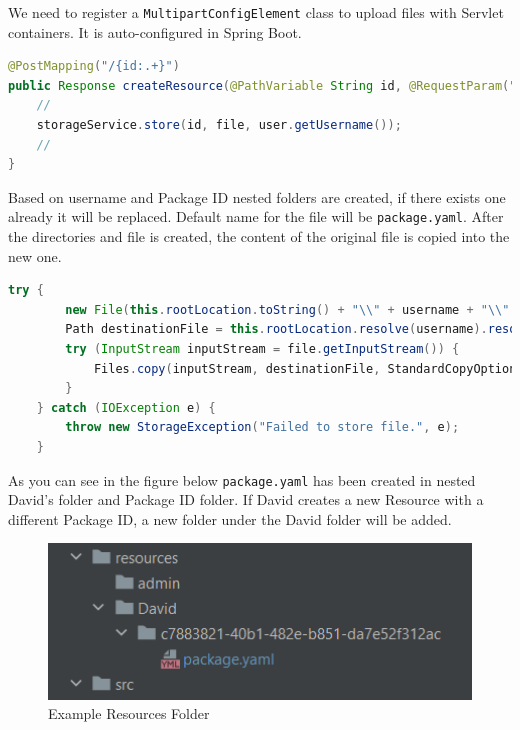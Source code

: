 We need to register a \texttt{MultipartConfigElement} class to upload files with Servlet containers. It is auto-configured in Spring Boot.

\begin{lstlisting}[language={Java}]
@PostMapping("/{id:.+}")
public Response createResource(@PathVariable String id, @RequestParam("file") MultipartFile file, @RequestParam("kind") String kind) {
    //
    storageService.store(id, file, user.getUsername());
    //
}
\end{lstlisting}

Based on username and Package ID nested folders are created, if there exists one already it will be replaced. Default name for the file will be \texttt{package.yaml}. After the directories and file is created, the content of the original file is copied into the new one.
\begin{lstlisting}[language={Java}]
    try {
        new File(this.rootLocation.toString() + "\\" + username + "\\" + id).mkdirs();
        Path destinationFile = this.rootLocation.resolve(username).resolve(id).resolve(Paths.get("package.yaml")).normalize().toAbsolutePath();
        try (InputStream inputStream = file.getInputStream()) {
            Files.copy(inputStream, destinationFile, StandardCopyOption.REPLACE_EXISTING);
        }
    } catch (IOException e) {
        throw new StorageException("Failed to store file.", e);
    }
\end{lstlisting}

As you can see in the figure below \texttt{package.yaml} has been created in nested David's folder and Package ID folder. If David creates a new Resource with a different Package ID, a new folder under the David folder will be added.
\begin{figure}[H]
	\centering
	\includegraphics[width=120mm]{images/folder-resources.png}
	\caption{Example Resources Folder}
	\label{ssec:exampple-resource-folder}
\end{figure}

